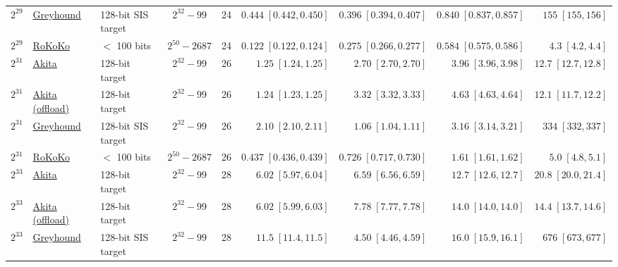 \begin{table}[H]
\begin{tabular}{@{}lllccrrrr@{}}
$2^{29}$ & \href{https://github.com/LayerZero-Labs/greyhound-reference/commit/672e74100496f6ef698ba35e241cf7593e3d57af}{Greyhound} & 128-bit SIS target & $2^{32}-99$ & 24 & $0.444\;[0.442, 0.450]$ & $0.396\;[0.394, 0.407]$ & $0.840\;[0.837, 0.857]$ & $155\;[155, 156]$ \\
$2^{29}$ & \href{https://github.com/lattice-arguments/rokoko/commit/26d07c73c54872b9e8d2b3200117a6a0a21b10ee}{RoKoKo} & $<$ 100 bits & $2^{50}-2687$ & 24 & $0.122\;[0.122, 0.124]$ & $0.275\;[0.266, 0.277]$ & $0.584\;[0.575, 0.586]$ & $4.3\;[4.2, 4.4]$ \\
\addlinespace
$2^{31}$ & \href{https://github.com/LayerZero-Labs/akita/commit/c0cb822f28b7b9efe85b1924b029d36e13cdf516}{Akita} & 128-bit target & $2^{32}-99$ & 26 & $1.25\;[1.24, 1.25]$ & $2.70\;[2.70, 2.70]$ & $3.96\;[3.96, 3.98]$ & $12.7\;[12.7, 12.8]$ \\
$2^{31}$ & \href{https://github.com/LayerZero-Labs/akita/commit/c0cb822f28b7b9efe85b1924b029d36e13cdf516}{Akita (offload)} & 128-bit target & $2^{32}-99$ & 26 & $1.24\;[1.23, 1.25]$ & $3.32\;[3.32, 3.33]$ & $4.63\;[4.63, 4.64]$ & $12.1\;[11.7, 12.2]$ \\
$2^{31}$ & \href{https://github.com/LayerZero-Labs/greyhound-reference/commit/672e74100496f6ef698ba35e241cf7593e3d57af}{Greyhound} & 128-bit SIS target & $2^{32}-99$ & 26 & $2.10\;[2.10, 2.11]$ & $1.06\;[1.04, 1.11]$ & $3.16\;[3.14, 3.21]$ & $334\;[332, 337]$ \\
$2^{31}$ & \href{https://github.com/lattice-arguments/rokoko/commit/26d07c73c54872b9e8d2b3200117a6a0a21b10ee}{RoKoKo} & $<$ 100 bits & $2^{50}-2687$ & 26 & $0.437\;[0.436, 0.439]$ & $0.726\;[0.717, 0.730]$ & $1.61\;[1.61, 1.62]$ & $5.0\;[4.8, 5.1]$ \\
\addlinespace
$2^{33}$ & \href{https://github.com/LayerZero-Labs/akita/commit/c0cb822f28b7b9efe85b1924b029d36e13cdf516}{Akita} & 128-bit target & $2^{32}-99$ & 28 & $6.02\;[5.97, 6.04]$ & $6.59\;[6.56, 6.59]$ & $12.7\;[12.6, 12.7]$ & $20.8\;[20.0, 21.4]$ \\
$2^{33}$ & \href{https://github.com/LayerZero-Labs/akita/commit/c0cb822f28b7b9efe85b1924b029d36e13cdf516}{Akita (offload)} & 128-bit target & $2^{32}-99$ & 28 & $6.02\;[5.99, 6.03]$ & $7.78\;[7.77, 7.78]$ & $14.0\;[14.0, 14.0]$ & $14.4\;[13.7, 14.6]$ \\
$2^{33}$ & \href{https://github.com/LayerZero-Labs/greyhound-reference/commit/672e74100496f6ef698ba35e241cf7593e3d57af}{Greyhound} & 128-bit SIS target & $2^{32}-99$ & 28 & $11.5\;[11.4, 11.5]$ & $4.50\;[4.46, 4.59]$ & $16.0\;[15.9, 16.1]$ & $676\;[673, 677]$ \\

\end{tabular}
\end{table}
